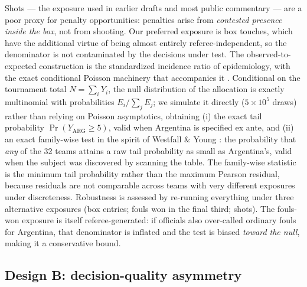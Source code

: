 \documentclass[11pt,a4paper]{article}
\begin{document}
Shots --- the exposure used in earlier drafts and most public commentary --- are a
poor proxy for penalty opportunities: penalties arise from \emph{contested presence
inside the box}, not from shooting. Our preferred exposure is box touches, which have
the additional virtue of being almost entirely referee-independent, so the
denominator is not contaminated by the decisions under test. The observed-to-expected
construction is the standardized incidence ratio of epidemiology, with the exact
conditional Poisson machinery that accompanies it \cite{breslow1987}. Conditional on the
tournament total $N = \sum_i Y_i$, the null distribution of the allocation is exactly
multinomial with probabilities $E_i / \sum_j E_j$; we simulate it directly
($5\times10^5$ draws) rather than relying on Poisson asymptotics, obtaining
(i) the exact tail probability $\Pr(Y_{\text{ARG}} \ge 5)$, valid when Argentina is
specified ex ante, and (ii) an exact family-wise test in the spirit of
Westfall \& Young \cite{westfall1993resampling}: the probability that \emph{any} of the 32 teams
attains a raw tail probability as small as Argentina's, valid when the subject was
discovered by scanning the table. The family-wise statistic is the minimum tail
probability rather than the maximum Pearson residual, because residuals are not
comparable across teams with very different exposures under discreteness. Robustness
is assessed by re-running everything under three alternative exposures (box entries;
fouls won in the final third; shots). The fouls-won exposure is itself
referee-generated: if officials also over-called ordinary fouls for Argentina, that
denominator is inflated and the test is biased \emph{toward the null}, making it a
conservative bound.

\subsection{Design B: decision-quality asymmetry}
\end{document}
